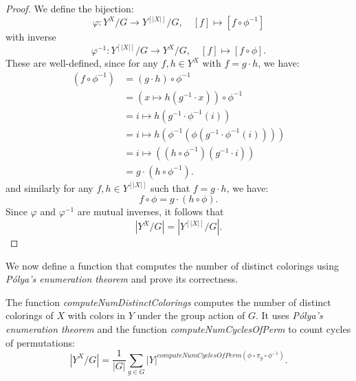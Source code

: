 \begin{proof}
  \leanok
  We define the bijection:
  \begin{equation*}
    \varphi : Y^X/G \to Y^{[|X|]}/G, \quad [f] \mapsto [f \circ \phi^{-1}]
  \end{equation*}
  with inverse
  \begin{equation*}
    \varphi^{-1} : Y^{[|X|]}/G \to Y^X/G, \quad [f] \mapsto [f \circ \phi].
  \end{equation*}
  These are well-defined, since for any $f, h \in Y^X$ with $f = g \cdot h$, we have:
  \begin{align*}
    (f \circ \phi^{-1}) &= (g \cdot h) \circ \phi^{-1} \\
    &= (x \mapsto h(g^{-1} \cdot x)) \circ \phi^{-1} \\
    &= i \mapsto h(g^{-1} \cdot \phi^{-1}(i)) \\
    &= i \mapsto h(\phi^{-1}(\phi(g^{-1} \cdot \phi^{-1}(i)))) \\
    &= i \mapsto ((h \circ \phi^{-1})(g^{-1} \cdot i)) \\
    &= g \cdot (h \circ \phi^{-1}).
  \end{align*}
  and similarly for any $f, h \in Y^{[|X|]}$ such that $f = g \cdot h$, we have:
  \begin{equation*}
    f \circ \phi = g \cdot (h \circ \phi).
  \end{equation*}
  Since $\varphi$ and $\varphi^{-1}$ are mutual inverses, it follows that
  \begin{equation*}
    |Y^X/G| = |Y^{[|X|]}/G|.
  \end{equation*}
\end{proof}

We now define a function that computes the number of distinct colorings using \emph{Pólya's enumeration theorem} and prove its correctness.

\begin{proposition}
  \label{def:computeNumDistinctColorings}
  \leanok
  The function \emph{computeNumDistinctColorings} computes the number of distinct colorings of $X$ with colors in $Y$ under the group action of $G$. It uses \emph{Pólya's enumeration theorem} and the function \emph{computeNumCyclesOfPerm} to count cycles of permutations:
  \begin{equation*}
    |Y^X/G| = \frac{1}{|G|} \sum_{g \in G} |Y|^{\textit{computeNumCyclesOfPerm} (\phi \circ \pi_g \circ \phi^{-1})}.
  \end{equation*}
\end{proposition}

